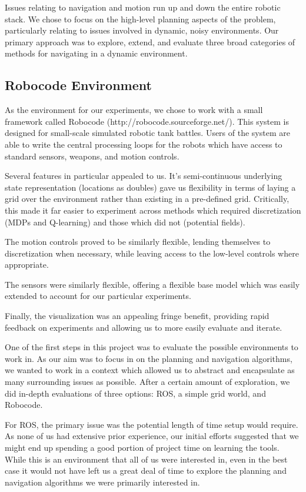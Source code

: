\documentclass{aiaa-tc}%
\begin{document}
Issues relating to navigation and motion run up and down the entire
robotic stack. We chose to focus on the high-level planning aspects of
the problem, particularly relating to issues involved in dynamic,
noisy environments. Our primary approach was to explore, extend, and
evaluate three broad categories of methods for navigating in a dynamic
environment.

\subsection{Robocode Environment}

As the environment for our experiments, we chose to work with a small
framework called Robocode (http://robocode.sourceforge.net/). This system is designed for small-scale
simulated robotic tank battles. Users of the system are able to write
the central processing loops for the robots which have access to
standard sensors, weapons, and motion controls. 

Several features in particular appealed to us. It's semi-continuous underlying state
representation (locations as doubles) gave us flexibility in
terms of laying a grid over the environment rather than existing in a
pre-defined grid. Critically, this made it far easier to experiment
across methods which required discretization (MDPs and Q-learning) and
those which did not (potential fields).

The motion controls proved to be similarly flexible, lending
themselves to discretization when necessary, while leaving access to
the low-level controls where appropriate.

The sensors were similarly flexible, offering a flexible base
model which was easily extended to account for our particular
experiments.

Finally, the visualization was an appealing fringe benefit, providing
rapid feedback on experiments and allowing us to more easily evaluate
and iterate.

One of the first steps in this project was to evaluate the possible
environments to work in. As our aim was to focus in on the planning and navigation algorithms,
we wanted to work in a context which allowed us to abstract and
encapsulate as many
surrounding issues as possible. After a certain amount of exploration, we did
in-depth evaluations of three options: ROS, a simple grid world, and
Robocode.

For ROS, the primary issue was the potential length of time setup
would require. As none of us had extensive prior experience, our
initial efforts suggested that we might end up spending a good portion
of project time on learning the tools. While this is an environment that all
of us were interested in, even in the best case it would not have left
us a great deal of time to explore the planning and navigation
algorithms we were primarily interested in.
\end{document}

